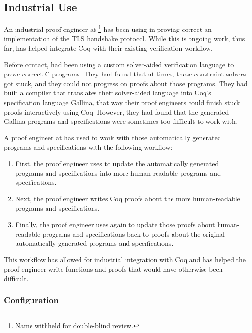 \subsection{Industrial Use}
\label{sec:industry}

An industrial proof engineer at \company\footnote{Name withheld for double-blind review.} has been using \toolname in proving
correct an implementation of the TLS handshake protocol.
While this is ongoing work, thus far,
\toolname has helped \company integrate Coq with their existing verification workflow.

Before contact, \company had been using a custom solver-aided verification language to prove correct C programs.
They had found that at times, those constraint solvers got stuck, and they could not
progress on proofs about those programs.
They had built a compiler that translates their solver-aided language into Coq's specification language Gallina,
that way their proof engineers could finish stuck proofs interactively using Coq.
However, they had found that the generated Gallina programs and specifications were sometimes too difficult to work with.

A proof engineer at \company has used \toolname to work with those automatically generated programs and specifications
with the following workflow:

\begin{enumerate}
\item First, the proof engineer uses \toolname to update the automatically generated programs and specifications into more
human-readable programs and specifications.
\item Next, the proof engineer writes Coq proofs about the more human-readable programs and specifications.
\item Finally, the proof engineer uses \toolname again to update those proofs about human-readable programs and specifications back to
proofs about the original automatically generated programs and specifications.
\end{enumerate}
This workflow has allowed for industrial integration with Coq and has helped the proof engineer write functions and proofs
that would have otherwise been difficult.


\subsubsection{Configuration}

